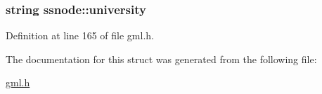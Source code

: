 \hypertarget{structssnode_a61b88a00f6337b6e8a82097e85fc20ab}{
\subsubsection[{university}]{\setlength{\rightskip}{0pt plus 5cm}string {\bf ssnode\-::university}}}\label{structssnode_a61b88a00f6337b6e8a82097e85fc20ab}


\-Definition at line 165 of file gml.\-h.



\-The documentation for this struct was generated from the following file\-:\begin{DoxyCompactItemize}
\item 
\hyperlink{gml_8h}{gml.\-h}\end{DoxyCompactItemize}
